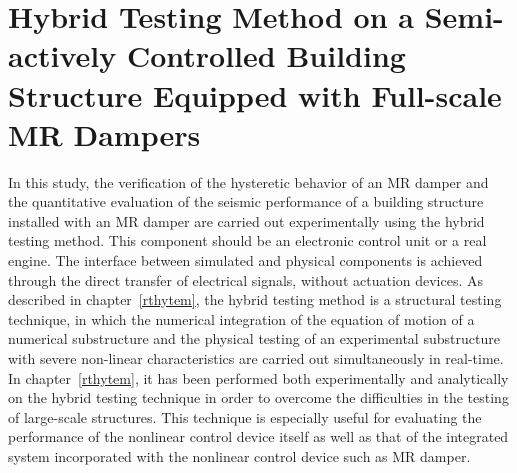 \chapter{Hybrid Testing Method on a Semi-actively Controlled Building Structure Equipped with Full-scale MR Dampers}
\label{chap:rthytem-mrdamper}

In this study, the verification of the hysteretic behavior of an MR damper and the quantitative evaluation of the seismic performance of a building structure installed with an MR damper are carried out experimentally using the hybrid testing method. This component should be an electronic control unit or a real engine. The interface between simulated and physical components is achieved through the direct transfer of electrical signals, without actuation devices\citep{christenson2008large}. As described in chapter~\ref{rthytem}, the hybrid testing method is a structural testing technique, in which the numerical integration of the equation of motion of a numerical substructure and the physical testing of an experimental substructure with severe non-linear characteristics are carried out simultaneously in real-time. In chapter~\ref{rthytem}, it has been performed both experimentally and analytically on the hybrid testing technique in order to overcome the difficulties in the testing of large-scale structures. This technique is especially useful for evaluating the performance of the nonlinear control device itself as well as that of the integrated system incorporated with the nonlinear control device such as MR damper.

